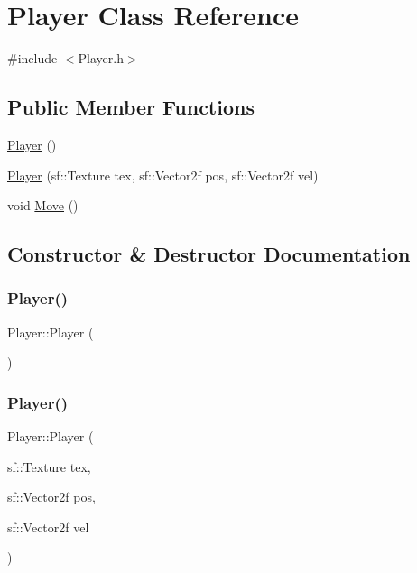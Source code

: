 \hypertarget{class_player}{}\section{Player Class Reference}
\label{class_player}


{\ttfamily \#include $<$Player.\+h$>$}

\subsection*{Public Member Functions}
\begin{DoxyCompactItemize}
\item 
\hyperlink{class_player_affe0cc3cb714f6deb4e62f0c0d3f1fd8}{Player} ()
\item 
\hyperlink{class_player_ab1a6fddc105f39a9caf5783a5aa1c80b}{Player} (sf\+::\+Texture tex, sf\+::\+Vector2f pos, sf\+::\+Vector2f vel)
\item 
void \hyperlink{class_player_a8746f750b36da18dff7a34da2e04b2eb}{Move} ()
\end{DoxyCompactItemize}


\subsection{Constructor \& Destructor Documentation}
\hypertarget{class_player_affe0cc3cb714f6deb4e62f0c0d3f1fd8}{}\label{class_player_affe0cc3cb714f6deb4e62f0c0d3f1fd8} 
\subsubsection{\texorpdfstring{Player()}{Player()}\hspace{0.1cm}{\footnotesize\ttfamily [1/2]}}
{\footnotesize\ttfamily Player\+::\+Player (\begin{DoxyParamCaption}{ }\end{DoxyParamCaption})}

\hypertarget{class_player_ab1a6fddc105f39a9caf5783a5aa1c80b}{}\label{class_player_ab1a6fddc105f39a9caf5783a5aa1c80b} 
\subsubsection{\texorpdfstring{Player()}{Player()}\hspace{0.1cm}{\footnotesize\ttfamily [2/2]}}
{\footnotesize\ttfamily Player\+::\+Player (\begin{DoxyParamCaption}\item[{sf\+::\+Texture}]{tex,  }\item[{sf\+::\+Vector2f}]{pos,  }\item[{sf\+::\+Vector2f}]{vel }\end{DoxyParamCaption})}



